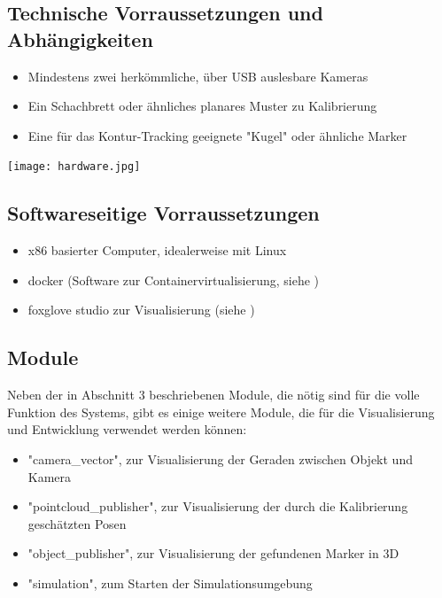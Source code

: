 \documentclass[12pt, ngerman]{article}
\begin{document}
\subsection{Technische Vorraussetzungen und Abhängigkeiten}
\begin{minipage}[c]{0.65\textwidth}
  \begin{itemize}
    \item Mindestens zwei herkömmliche, über USB auslesbare Kameras
    \item Ein Schachbrett oder ähnliches planares Muster zu Kalibrierung
    \item Eine für das Kontur-Tracking geeignete "Kugel" oder ähnliche Marker
  \end{itemize}
\end{minipage}
\hfill
\begin{minipage}[c]{0.3\textwidth}
  \texttt{[image: hardware.jpg]}
\end{minipage}

\subsection{Softwareseitige Vorraussetzungen}
\begin{itemize}
  \item x86 basierter Computer, idealerweise mit Linux
  \item docker (Software zur Containervirtualisierung, siehe \cite{docker})
  \item foxglove studio zur Visualisierung (siehe \cite{foxglove})
\end{itemize}

\subsection{Module}
Neben der in Abschnitt 3 beschriebenen Module, die nötig sind für die volle Funktion des Systems, gibt es einige weitere Module, die für die Visualisierung und Entwicklung verwendet werden können:
\begin{itemize}
  \item "camera\_vector", zur Visualisierung der Geraden zwischen Objekt und Kamera
  \item "pointcloud\_publisher", zur Visualisierung der durch die Kalibrierung geschätzten Posen
  \item "object\_publisher", zur Visualisierung der gefundenen Marker in 3D
  \item "simulation", zum Starten der Simulationsumgebung 
\end{itemize}
\end{document}
